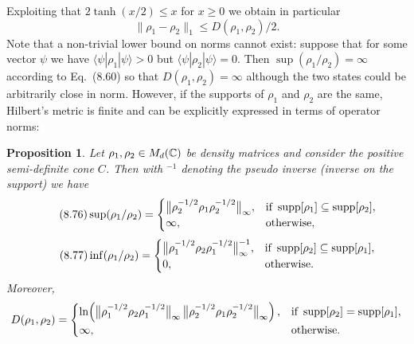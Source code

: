 \documentclass[11pt,a4paper]{article}
\theoremstyle{plain}
\newtheorem{proposition}{Proposition}[section]
\theoremstyle{definition}
\theoremstyle{remark}
\begin{document}
Exploiting that $2\tanh(x/2)\le x$ for $x\ge 0$ we obtain in particular
\begin{equation}\tag{8.75}
    \|\rho_1-\rho_2\|_1 \le D(\rho_1,\rho_2)/2.
\end{equation}
Note that a non-trivial lower bound on norms cannot exist: suppose that for some vector $\psi$ we have $\langle\psi|\rho_1|\psi\rangle>0$
but $\langle\psi|\rho_2|\psi\rangle=0$. Then $\sup(\rho_1/\rho_2)=\infty$ according to Eq.~(8.60) so that $D(\rho_1,\rho_2)=\infty$
although the two states could be arbitrarily close in norm. However, if the supports of $\rho_1$ and $\rho_2$ are the same, Hilbert's metric is finite and can be explicitly expressed in terms of operator norms:

\begin{proposition}
    Let $\rho_1,\rho_2\in M_d(\mathbb{C})$ be density matrices and consider the positive semi-definite cone $C$.
    Then with $^{-1}$ denoting the pseudo inverse (inverse on the support) we have
    \begin{equation}\tag{8.76}
        \sup(\rho_1/\rho_2)=
        \begin{cases}
            \bigl\|\rho_2^{-1/2}\rho_1\rho_2^{-1/2}\bigr\|_\infty, & \text{if }\operatorname{supp}[\rho_1]\subseteq \operatorname{supp}[\rho_2], \\
            \infty,                                                & \text{otherwise},
        \end{cases}
    \end{equation}
    \begin{equation}\tag{8.77}
        \inf(\rho_1/\rho_2)=
        \begin{cases}
            \bigl\|\rho_1^{-1/2}\rho_2\rho_1^{-1/2}\bigr\|_\infty^{-1}, & \text{if }\operatorname{supp}[\rho_2]\subseteq \operatorname{supp}[\rho_1], \\
            0,                                                          & \text{otherwise}.
        \end{cases}
    \end{equation}
    Moreover,
    \[
        D(\rho_1,\rho_2)=
        \begin{cases}
            \ln\!\left(\bigl\|\rho_1^{-1/2}\rho_2\rho_1^{-1/2}\bigr\|_\infty\,\bigl\|\rho_2^{-1/2}\rho_1\rho_2^{-1/2}\bigr\|_\infty\right),
                    & \text{if }\operatorname{supp}[\rho_2]=\operatorname{supp}[\rho_1], \\
            \infty, & \text{otherwise.}
        \end{cases}
    \]
\end{proposition}
\end{document}
